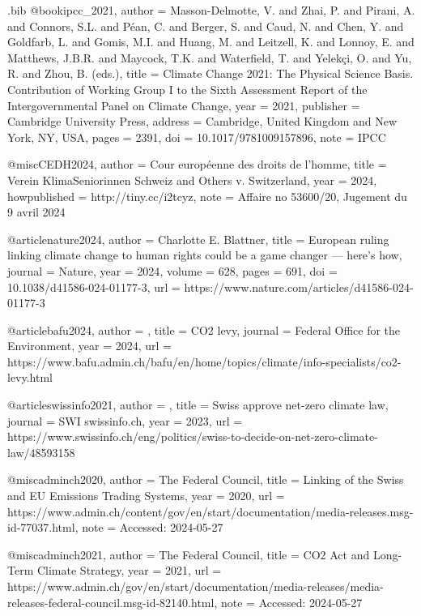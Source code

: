 \begin{filecontents}{.bib}
@book{ipcc_2021,
  author    = {{Masson-Delmotte, V. and Zhai, P. and Pirani, A. and Connors, S.L. and Péan, C. and Berger, S. and Caud, N. and Chen, Y. and Goldfarb, L. and Gomis, M.I. and Huang, M. and Leitzell, K. and Lonnoy, E. and Matthews, J.B.R. and Maycock, T.K. and Waterfield, T. and Yelekçi, O. and Yu, R. and Zhou, B. (eds.)}},
  title     = {Climate Change 2021: The Physical Science Basis. Contribution of Working Group I to the Sixth Assessment Report of the Intergovernmental Panel on Climate Change},
  year      = {2021},
  publisher = {Cambridge University Press},
  address   = {Cambridge, United Kingdom and New York, NY, USA},
  pages     = {2391},
  doi       = {10.1017/9781009157896},
  note      = {IPCC}
}

@misc{CEDH2024,
  author       = {{Cour européenne des droits de l'homme}},
  title        = {Verein KlimaSeniorinnen Schweiz and Others v. Switzerland},
  year         = 2024,
  howpublished = {http://tiny.cc/i2tcyz},
  note         = {Affaire no 53600/20, Jugement du 9 avril 2024}
}



@article{nature2024,
  author = {{Charlotte E. Blattner}},
  title = {{European ruling linking climate change to human rights could be a game changer — here’s how}},
  journal = {Nature},
  year = {2024},
  volume = {628},
  pages = {691},
  doi = {10.1038/d41586-024-01177-3},
  url = {https://www.nature.com/articles/d41586-024-01177-3}
}


@article{bafu2024,
  author = {},
  title = {CO2 levy},
  journal = {Federal Office for the Environment},
  year = {2024},
  url = {https://www.bafu.admin.ch/bafu/en/home/topics/climate/info-specialists/co2-levy.html}
}

@article{swissinfo2021,
  author = {},
  title = {Swiss approve net-zero climate law},
  journal = {SWI swissinfo.ch},
  year = {2023},
  url = {https://www.swissinfo.ch/eng/politics/swiss-to-decide-on-net-zero-climate-law/48593158}
}


@misc{adminch2020,
  author       = {{The Federal Council}},
  title        = {Linking of the Swiss and EU Emissions Trading Systems},
  year         = 2020,
  url = {https://www.admin.ch/content/gov/en/start/documentation/media-releases.msg-id-77037.html},
  note         = {Accessed: 2024-05-27}
}


@misc{adminch2021,
  author       = {{The Federal Council}},
  title        = {CO2 Act and Long-Term Climate Strategy},
  year         = 2021,
  url = {https://www.admin.ch/gov/en/start/documentation/media-releases/media-releases-federal-council.msg-id-82140.html},
  note         = {Accessed: 2024-05-27}
}




\end{filecontents}
